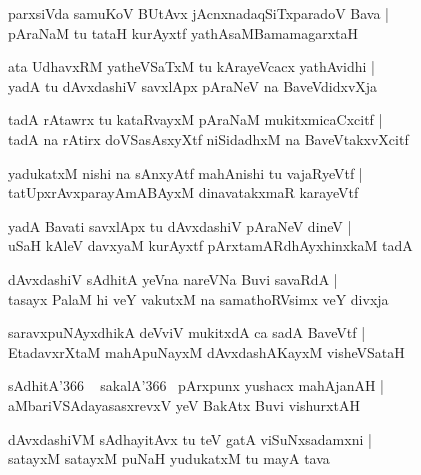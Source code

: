 \documentclass[twoside,12pt,openright]{book}
\newcounter{shloka}[chapter]
\begin{document}
\begin{shloka}%
parxsiVda samuKoV BUtAvx jAcnxnadaqSiTxparadoV Bava |\\
pAraNaM tu tataH kurAyxtf yathAsaMBamamagarxtaH
\end{shloka}

\begin{shloka}%
ata UdhavxRM yatheVSaTxM tu kArayeVcacx yathAvidhi |\\
yadA tu dAvxdashiV savxlApx pAraNeV na BaveVdidxvXja
\end{shloka}

\begin{shloka}%
tadA rAtawrx tu kataRvayxM pAraNaM mukitxmicaCxcitf |\\
tadA na rAtirx doVSasAsxyXtf niSidadhxM na BaveVtakxvXcitf
\end{shloka}

\begin{shloka}%
yadukatxM nishi na sAnxyAtf mahAnishi tu vajaRyeVtf |\\
tatUpxrAvxparayAmABAyxM dinavatakxmaR karayeVtf
\end{shloka}

\begin{shloka}%
yadA Bavati savxlApx tu dAvxdashiV pAraNeV dineV |\\
uSaH kAleV davxyaM kurAyxtf pArxtamARdhAyxhinxkaM tadA
\end{shloka}

\begin{shloka}%
dAvxdashiV sAdhitA yeVna nareVNa Buvi savaRdA |\\
tasayx PalaM hi veY vakutxM na samathoRVsimx veY divxja
\end{shloka}

\begin{shloka}%
saravxpuNAyxdhikA deVviV mukitxdA ca sadA BaveVtf |\\
EtadavxrXtaM mahApuNayxM dAvxdashAKayxM visheVSataH 
\end{shloka}

\begin{shloka}%
sAdhitA\char'366 ~ sakalA\char'366 ~pArxpunx yushacx mahAjanAH |\\
aMbariVSAdayasasxrevxV yeV BakAtx Buvi vishurxtAH
\end{shloka}

\begin{shloka}%
dAvxdashiVM  sAdhayitAvx tu teV gatA viSuNxsadamxni |\\
satayxM satayxM puNaH yudukatxM tu mayA tava
\end{shloka}
\end{document}
